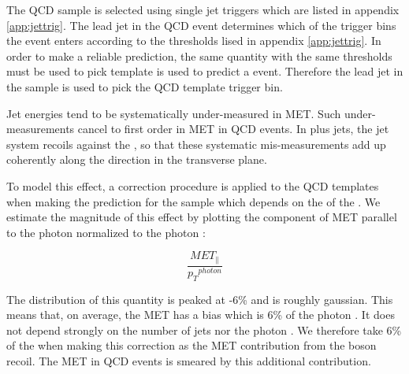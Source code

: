 The QCD sample is selected using single jet triggers which are listed in appendix \ref{app:jettrig}. 
The lead jet \pt in the QCD event determines which of the trigger bins the event enters according 
to the thresholds lised in appendix \ref{app:jettrig}. In order to make a reliable prediction, 
the same quantity with the same thresholds must be used to pick template is used to predict 
a \Z event. Therefore the lead jet \pt in the \Z sample is used to pick the QCD template trigger bin.


Jet energies tend to be systematically under-measured in MET. Such under-measurements cancel to 
first order in MET in QCD events. In \Z plus jets, the jet system recoils against the \Z, so that 
these systematic mis-measurements add up coherently along the \Z direction in the transverse plane.

To model this effect, a correction procedure is applied to the QCD templates when making the 
prediction for the \Z sample which depends on the \pt of the \Z. We estimate the magnitude 
of this effect by plotting
the component of MET parallel to the photon \pt normalized to the photon \pt:

\begin{equation}
\frac{MET_{\parallel}}{{p_T}^{photon}}
\end{equation}

%

The distribution of this quantity is peaked at -6\% and is roughly gaussian. 
This means that, on average, the MET has a bias which is 6\% of the photon \pt.
It does not depend strongly on 
the number of jets nor the photon \pt. We therefore take 6\% of the \Z \pt when making this 
correction as the MET contribution from the boson recoil. 
The MET in QCD events is smeared by this additional contribution.


